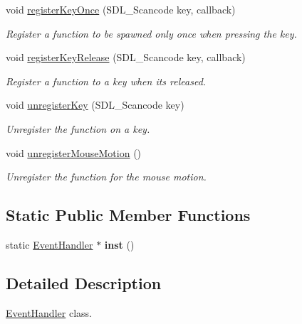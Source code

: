 \begin{DoxyCompactItemize}
void \mbox{\hyperlink{classEventHandler_afd4a4e6d06efbc32e657a662af6bf4ef}{register\+Key\+Once}} (S\+D\+L\+\_\+\+Scancode key, callback)
\begin{DoxyCompactList}\small\item\em Register a function to be spawned only once when pressing the key. \end{DoxyCompactList}\item 
void \mbox{\hyperlink{classEventHandler_ae14254f56ab16e81bd4109afcabf9b9a}{register\+Key\+Release}} (S\+D\+L\+\_\+\+Scancode key, callback)
\begin{DoxyCompactList}\small\item\em Register a function to a key when it\textquotesingle{}s released. \end{DoxyCompactList}\item 
void \mbox{\hyperlink{classEventHandler_a0fb543b17c41ef73df71b9498fd45359}{unregister\+Key}} (S\+D\+L\+\_\+\+Scancode key)
\begin{DoxyCompactList}\small\item\em Unregister the function on a key. \end{DoxyCompactList}\item 
void \mbox{\hyperlink{classEventHandler_a8907091f20fddc7a4a94ab994902aea7}{unregister\+Mouse\+Motion}} ()
\begin{DoxyCompactList}\small\item\em Unregister the function for the mouse motion. \end{DoxyCompactList}\end{DoxyCompactItemize}
\subsection*{Static Public Member Functions}
\begin{DoxyCompactItemize}
\item 
\mbox{\label{classEventHandler_aae0146e551996e37079f5cd29df050d1}} 
static \mbox{\hyperlink{classEventHandler}{Event\+Handler}} $\ast$ {\bfseries inst} ()
\end{DoxyCompactItemize}


\subsection{Detailed Description}
\mbox{\hyperlink{classEventHandler}{Event\+Handler}} class. 



